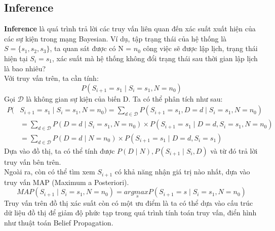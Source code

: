 \documentclass{my_style}
\begin{document}
\subsection{Inference}
\textbf{Inference} là quá trình trả lời các truy vấn liên quan đến xác suất xuất hiện của các sự kiện trong mạng Bayesian. Ví dụ, tập trạng thái của hệ thống là $S = \{s_{1}, s_{2}, s_{3}\}$, ta quan sát được có N = $n_{0}$ công việc sẽ được lập lịch, trạng thái hiện tại $S_{i} = s_{1}$, xác suất mà hệ thống không đổi trạng thái sau thời gian lập lịch là bao nhiêu? \\
Với truy vấn trên, ta cần tính: 
\begin{equation*}
	P(S_{i+1} = s_{1} \mid S_{i} = s_{1}, N = n_{0})
\end{equation*}
Gọi $\mathcal{D}$ là không gian sự kiện của biến D. Ta có thể phân tích như sau: 
\begin{align*}
	P(&S_{i+1} = s_{1} \mid S_{i} = s_{1}, N = n_{0}) = \sum_{d \in \mathcal{D}}P(S_{i+1} = s_{1}, D = d \mid S_{i} = s_{1}, N = n_{0}) \\
			&= \sum_{d \in \mathcal{D}}P(D = d \mid S_{i} = s_{1}, N = n_{0}) \times P(S_{i + 1} = s_{1} \mid D = d, S_{i} = s_{1}, N = n_{0}) \\
			&= \sum_{d \in \mathcal{D}}P(D = d \mid N = n_{0}) \times P(S_{i+1} = s_{1} \mid D = d, S_{i} = s_{1})		
\end{align*}
Dựa vào đồ thị, ta có thể tính được $P(D \mid N), P(S_{i+1} \mid S_{i}, D)$ và từ đó trả lời truy vấn bên trên. \\
Ngoài ra, còn có thể tìm xem $S_{i + 1}$ có khả năng nhận giá trị nào nhất, dựa vào truy vấn MAP (Maximum a Posteriori). 
\begin{equation*}
	MAP(S_{i+1} \mid S_{i} = s_{1}, N = n_{0}) = arg\underset{s}maxP(S_{i + 1} = s \mid S_{i} = s_{1}, N = n_{0})
\end{equation*}
Truy vấn trên đồ thị xác suất còn có một ưu điểm là ta có thể dựa vào cấu trúc dữ liệu đồ thị để giảm độ phức tạp trong quá trình tính toán truy vấn, điển hình như thuật toán Belief Propagation\cite{29}.\\
\end{document}

